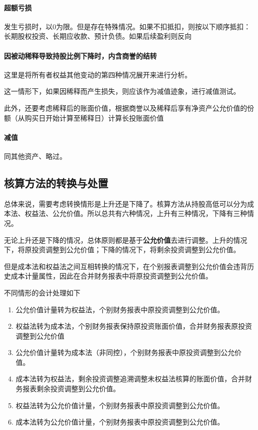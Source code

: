 \documentclass[UTF8,12pt]{ctexart}
\numberwithin{equation}{section} %
\numberwithin{figure}{section}
\numberwithin{table}{section}
\begin{document}
	\paragraph{超额亏损}
	发生亏损时，以0为限。但是存在特殊情况。如果不扣抵扣，则按以下顺序抵扣：长期股权投资、长期应收款、预计负债。如果后续盈利则反向
	
	\paragraph{因被动稀释导致持股比例下降时，内含商誉的结转} 这里是将所有者权益其他变动的第四种情况展开来进行分析。
	
	这一情形下，如果因稀释而产生损失，则应该作为减值迹象，进行减值测试。
	
	此外，还要考虑稀释后的账面价值，根据商誉以及稀释后享有净资产公允价值的份额（从购买日开始计算至稀释日）计算长投账面价值
	
	\paragraph{减值}
	同其他资产、略过。
	
	\subsection{核算方法的转换与处置}
	总体来说，需要考虑转换情形是上升还是下降了。核算方法从持股高低可以分为成本法、权益法、公允价值。所以总共有六种情况，上升有三种情况，下降有三种情况。
	
	无论上升还是下降的情况，总体原则都是基于\textbf{公允价值}去进行调整。上升的情况下，将原投资调整到公允价值；下降的情况下，将剩余投资调整到公允价值。
	
	但是成本法和权益法之间互相转换的情况下，在个别报表调整到公允价值会违背历史成本计量属性，因此在合并财务报表中将原投资调整到公允价值。
	
	不同情形的会计处理如下
	\begin{enumerate}
		\item 公允价值计量转为权益法，个别财务报表中原投资调整到公允价值。
		
		\item 权益法转为成本法，个别财务报表保持原投资账面价值，合并财务报表原投资调整到公允价值
		
		\item 公允价值计量转为成本法（非同控），个别财务报表中原投资调整到公允价值。
		
		\item 成本法转为权益法，剩余投资调整追溯调整未权益法核算的账面价值，合并财务报表剩余投资调整到公允价值。
		
		\item 权益法转为公允价值计量，个别财务报表中原投资调整到公允价值。
		
		\item 成本法转为公允价值计量，个别财务报表中原投资调整到公允价值。
	\end{enumerate}
	
\end{document}

